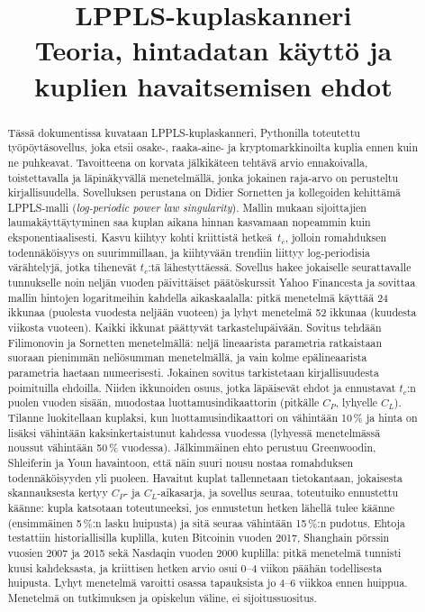 \documentclass[10pt,a4paper]{article}
\title{\color{navy}\textbf{LPPLS-kuplaskanneri}\\[4pt]
  \large\mdseries Teoria, hintadatan käyttö ja kuplien havaitsemisen ehdot}
\author{}
\date{}
\newcommand{\tc}{t_c}
\begin{document}
\maketitle
\vspace{-3.5em}
\thispagestyle{plain}

\begin{abstract}
\noindent
Tässä dokumentissa kuvataan LPPLS-kuplaskanneri, Pythonilla toteutettu työpöytäsovellus, joka
etsii osake-, raaka-aine- ja kryptomarkkinoilta kuplia ennen kuin ne puhkeavat. Tavoitteena on
korvata jälkikäteen tehtävä arvio ennakoivalla, toistettavalla ja läpinäkyvällä menetelmällä,
jonka jokainen raja-arvo on perusteltu kirjallisuudella. Sovelluksen perustana on Didier
Sornetten ja kollegoiden kehittämä LPPLS-malli (\emph{log-periodic power law singularity}).
Mallin mukaan sijoittajien laumakäyttäytyminen saa kuplan aikana hinnan kasvamaan nopeammin kuin
eksponentiaalisesti. Kasvu kiihtyy kohti kriittistä hetkeä~$\tc$, jolloin romahduksen
todennäköisyys on suurimmillaan, ja kiihtyvään trendiin liittyy log-periodisia värähtelyjä,
jotka tihenevät $\tc$:tä lähestyttäessä. Sovellus hakee jokaiselle seurattavalle tunnukselle
noin neljän vuoden päivittäiset päätöskurssit Yahoo Financesta ja sovittaa mallin hintojen
logaritmeihin kahdella aikaskaalalla: pitkä menetelmä käyttää 24 ikkunaa (puolesta vuodesta
neljään vuoteen) ja lyhyt menetelmä 52 ikkunaa (kuudesta viikosta vuoteen). Kaikki ikkunat
päättyvät tarkastelupäivään. Sovitus tehdään Filimonovin ja Sornetten menetelmällä: neljä
lineaarista parametria ratkaistaan suoraan pienimmän neliösumman menetelmällä, ja vain kolme
epälineaarista parametria haetaan numeerisesti. Jokainen sovitus tarkistetaan kirjallisuudesta
poimituilla ehdoilla. Niiden ikkunoiden osuus, jotka läpäisevät ehdot ja ennustavat $\tc$:n
puolen vuoden sisään, muodostaa luottamusindikaattorin (pitkälle $C_P$, lyhyelle $C_L$).
Tilanne luokitellaan kuplaksi, kun luottamusindikaattori on vähintään 10\,\% ja hinta on
lisäksi vähintään kaksinkertaistunut kahdessa vuodessa (lyhyessä menetelmässä noussut
vähintään 50\,\% vuodessa). Jälkimmäinen ehto perustuu Greenwoodin, Shleiferin ja Youn havaintoon, että
näin suuri nousu nostaa romahduksen todennäköisyyden yli puoleen. Havaitut kuplat tallennetaan
tietokantaan, jokaisesta skannauksesta kertyy $C_P$- ja $C_L$-aikasarja, ja sovellus seuraa, toteutuiko ennustettu käänne: kupla katsotaan toteutuneeksi,
jos ennustetun hetken lähellä tulee käänne (ensimmäinen 5\,\%:n lasku huipusta) ja sitä seuraa
vähintään 15\,\%:n pudotus. Ehtoja
testattiin historiallisilla kuplilla, kuten Bitcoinin vuoden 2017, Shanghain pörssin vuosien
2007 ja 2015 sekä Nasdaqin vuoden 2000 kuplilla: pitkä menetelmä tunnisti kuusi kahdeksasta,
ja kriittisen hetken arvio osui 0--4 viikon päähän todellisesta huipusta. Lyhyt menetelmä
varoitti osassa tapauksista jo 4--6 viikkoa ennen huippua. Menetelmä on tutkimuksen
ja opiskelun väline, ei sijoitussuositus.
\end{abstract}
\end{document}
